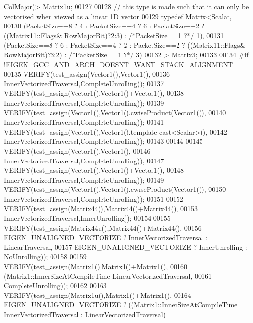 \begin{DoxyCode}
      \hyperlink{group__enums_ggaacded1a18ae58b0f554751f6cdf9eb13a0cbd4bdd0abcfc0224c5fcb5e4f6669a}{ColMajor})> Matrix1u;
00127 
00128     \textcolor{comment}{// this type is made such that it can only be vectorized when viewed as a linear 1D vector}
00129     \textcolor{keyword}{typedef} \hyperlink{group___core___module_class_eigen_1_1_matrix}{Matrix}<Scalar,
00130         (PacketSize==8 ? 4 : PacketSize==4 ? 6 : PacketSize==2 ? ((Matrix11::Flags&
      \hyperlink{group__flags_gae4f56c2a60bbe4bd2e44c5b19cbe8762}{RowMajorBit})?2:3) : \textcolor{comment}{/*PacketSize==1 ?*/} 1),
00131         (PacketSize==8 ? 6 : PacketSize==4 ? 2 : PacketSize==2 ? ((Matrix11::Flags&
      \hyperlink{group__flags_gae4f56c2a60bbe4bd2e44c5b19cbe8762}{RowMajorBit})?3:2) : \textcolor{comment}{/*PacketSize==1 ?*/} 3)
00132       > Matrix3;
00133     
00134 \textcolor{preprocessor}{    #if !EIGEN\_GCC\_AND\_ARCH\_DOESNT\_WANT\_STACK\_ALIGNMENT}
00135     VERIFY(test\_assign(Vector1(),Vector1(),
00136       InnerVectorizedTraversal,CompleteUnrolling));
00137     VERIFY(test\_assign(Vector1(),Vector1()+Vector1(),
00138       InnerVectorizedTraversal,CompleteUnrolling));
00139     VERIFY(test\_assign(Vector1(),Vector1().cwiseProduct(Vector1()),
00140       InnerVectorizedTraversal,CompleteUnrolling));
00141     VERIFY(test\_assign(Vector1(),Vector1().\textcolor{keyword}{template} cast<Scalar>(),
00142       InnerVectorizedTraversal,CompleteUnrolling));
00143 
00144 
00145     VERIFY(test\_assign(Vector1(),Vector1(),
00146       InnerVectorizedTraversal,CompleteUnrolling));
00147     VERIFY(test\_assign(Vector1(),Vector1()+Vector1(),
00148       InnerVectorizedTraversal,CompleteUnrolling));
00149     VERIFY(test\_assign(Vector1(),Vector1().cwiseProduct(Vector1()),
00150       InnerVectorizedTraversal,CompleteUnrolling));
00151 
00152     VERIFY(test\_assign(Matrix44(),Matrix44()+Matrix44(),
00153       InnerVectorizedTraversal,InnerUnrolling));
00154 
00155     VERIFY(test\_assign(Matrix44u(),Matrix44()+Matrix44(),
00156       EIGEN\_UNALIGNED\_VECTORIZE ? InnerVectorizedTraversal : LinearTraversal,
00157       EIGEN\_UNALIGNED\_VECTORIZE ? InnerUnrolling : NoUnrolling));
00158 
00159     VERIFY(test\_assign(Matrix1(),Matrix1()+Matrix1(),
00160       (Matrix1::InnerSizeAtCompileTime %
      LinearVectorizedTraversal,
00161       CompleteUnrolling));
00162 
00163     VERIFY(test\_assign(Matrix1u(),Matrix1()+Matrix1(),
00164       EIGEN\_UNALIGNED\_VECTORIZE ? ((Matrix1::InnerSizeAtCompileTime %
      InnerVectorizedTraversal : LinearVectorizedTraversal)

\end{DoxyCode}
